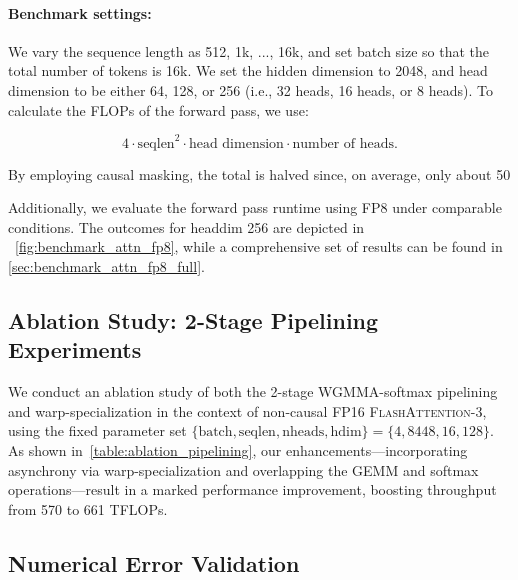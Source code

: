 \paragraph{Benchmark settings:} We vary the sequence length as 512, 1k, ..., 16k, and set batch size so that the total number of tokens is 16k. We set the hidden dimension to 2048, and head dimension to be either 64, 128, or 256 (i.e., 32 heads, 16 heads, or 8 heads). To calculate the FLOPs of the forward pass, we use:

\begin{equation*}
  4 \cdot \text{seqlen}^2 \cdot \text{head dimension} \cdot \text{number of heads}.
\end{equation*}

By employing causal masking, the total is halved since, on average, only about 50%

Additionally, we evaluate the forward pass runtime using FP8 under comparable conditions. The outcomes for headdim 256 are depicted in ~\cref{fig:benchmark_attn_fp8}, while a comprehensive set of results can be found in \cref{sec:benchmark_attn_fp8_full}.

\subsection{Ablation Study: 2-Stage Pipelining Experiments}
\label{sec:2-stage-pipelining-experiments}

We conduct an ablation study of both the 2-stage WGMMA-softmax pipelining and warp-specialization in the context of non-causal FP16 \textsc{FlashAttention-3}, using the fixed parameter set $\{\text{batch}, \text{seqlen}, \text{nheads}, \text{hdim}\} = \{ 4, 8448, 16, 128\}$. As shown in~\cref{table:ablation_pipelining}, our enhancements—incorporating asynchrony via warp-specialization and overlapping the GEMM and softmax operations—result in a marked performance improvement, boosting throughput from 570 to 661 TFLOPs.

\subsection{Numerical Error Validation}
\label{sec:numerical_error}


